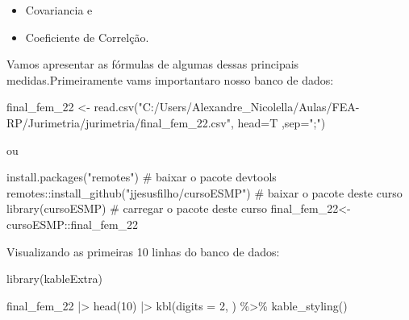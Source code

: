 \documentclass[
  letterpaper,
  DIV=11,
  numbers=noendperiod]{scrreprt}
\newenvironment{Shaded}{\begin{snugshade}}{\end{snugshade}}
\newcommand{\AttributeTok}[1]{\textcolor[rgb]{0.40,0.45,0.13}{#1}}
\newcommand{\CommentTok}[1]{\textcolor[rgb]{0.37,0.37,0.37}{#1}}
\newcommand{\DecValTok}[1]{\textcolor[rgb]{0.68,0.00,0.00}{#1}}
\newcommand{\FunctionTok}[1]{\textcolor[rgb]{0.28,0.35,0.67}{#1}}
\newcommand{\NormalTok}[1]{\textcolor[rgb]{0.00,0.23,0.31}{#1}}
\newcommand{\OtherTok}[1]{\textcolor[rgb]{0.00,0.23,0.31}{#1}}
\newcommand{\SpecialCharTok}[1]{\textcolor[rgb]{0.37,0.37,0.37}{#1}}
\newcommand{\StringTok}[1]{\textcolor[rgb]{0.13,0.47,0.30}{#1}}
\providecommand{\tightlist}{%
  \setlength{\itemsep}{0pt}\setlength{\parskip}{0pt}}
\begin{document}
\begin{itemize}
\tightlist
\item
  Covariancia e
\item
  Coeficiente de Correlção.
\end{itemize}

Vamos apresentar as fórmulas de algumas dessas principais
medidas.Primeiramente vams importantaro nosso banco de dados:

\begin{Shaded}
\begin{Highlighting}[]
\NormalTok{final\_fem\_22 }\OtherTok{\textless{}{-}} \FunctionTok{read.csv}\NormalTok{(}\StringTok{"C:/Users/Alexandre\_Nicolella/Aulas/FEA{-}RP/Jurimetria/jurimetria/final\_fem\_22.csv"}\NormalTok{, }\AttributeTok{head=}\NormalTok{T ,}\AttributeTok{sep=}\StringTok{";"}\NormalTok{)}
\end{Highlighting}
\end{Shaded}

ou

\begin{Shaded}
\begin{Highlighting}[]
\FunctionTok{install.packages}\NormalTok{(}\StringTok{"remotes"}\NormalTok{) }\CommentTok{\# baixar o pacote devtools}
\NormalTok{remotes}\SpecialCharTok{::}\FunctionTok{install\_github}\NormalTok{(}\StringTok{"jjesusfilho/cursoESMP"}\NormalTok{) }\CommentTok{\# baixar o pacote deste curso}
\FunctionTok{library}\NormalTok{(cursoESMP) }\CommentTok{\# carregar o pacote deste curso}
\NormalTok{final\_fem\_22}\OtherTok{\textless{}{-}}\NormalTok{cursoESMP}\SpecialCharTok{::}\NormalTok{final\_fem\_22}
\end{Highlighting}
\end{Shaded}

Visualizando as primeiras 10 linhas do banco de dados:

\begin{Shaded}
\begin{Highlighting}[]
\FunctionTok{library}\NormalTok{(kableExtra)}

\NormalTok{final\_fem\_22 }\SpecialCharTok{|\textgreater{}} 
  \FunctionTok{head}\NormalTok{(}\DecValTok{10}\NormalTok{) }\SpecialCharTok{|\textgreater{}} 
  \FunctionTok{kbl}\NormalTok{(}\AttributeTok{digits =} \DecValTok{2}\NormalTok{,  ) }\SpecialCharTok{\%\textgreater{}\%}
     \FunctionTok{kable\_styling}\NormalTok{()}
\end{Highlighting}
\end{Shaded}
\end{document}
